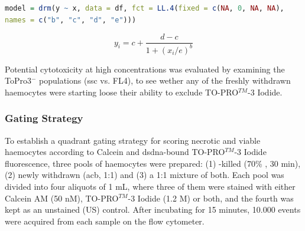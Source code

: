 \begin{lstlisting}[language=R, caption = {The R source code run to fit the four-parameter log-logistic regression model in RStudio.}]
model = drm(y ~ x, data = df, fct = LL.4(fixed = c(NA, 0, NA, NA), 
names = c("b", "c", "d", "e")))
\end{lstlisting}

\begin{equation}
\label{eq:LL4}
y_{i} = c + \dfrac{d-c}{1 + (x_i / e)^b}
\end{equation}

Potential cytotoxicity at high concentrations was evaluated by examining the ToPro3$^{-}$ populations (\acrshort{ssc} vs. FL4), to see wether any of the freshly withdrawn haemocytes were starting loose their ability to exclude TO-PRO$^{TM}$-3 Iodide.

\subsubsection{Gating Strategy}
\label{subsubsection: gating validation}
To establish a quadrant gating strategy for scoring necrotic and viable haemocytes according to Calcein and \acrshort{dsdna}-bound TO-PRO$^{TM}$-3 Iodide fluorescence, three pools of haemocytes were prepared: (1) -killed (70\% , 30 min), (2) newly withdrawn (\acrshort{acb}, 1:1) and (3) a 1:1 mixture of both. Each pool was divided into four aliquots of 1 mL, where three of them were stained with either Calcein AM (50 nM), TO-PRO$^{TM}$-3 Iodide (1.2 \micro M) or both, and the fourth was kept as an unstained (US) control. After incubating for 15 minutes, 10.000 events were acquired from each sample on the flow cytometer.

